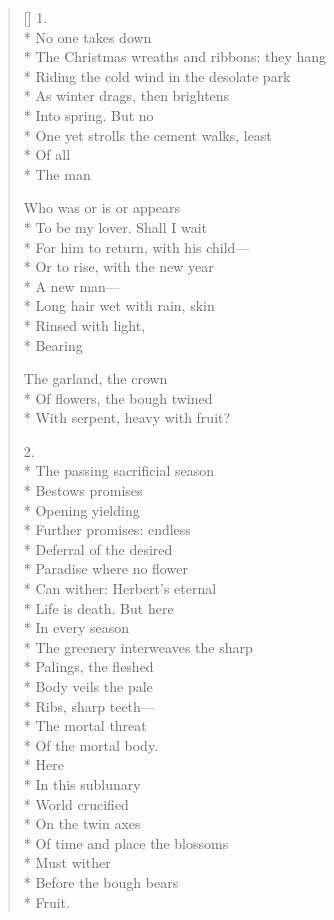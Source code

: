 \label{ch:in_time}
\settowidth{\versewidth}{The Christmas wreathes and ribbons: they flutter}
\begin{verse}[\versewidth]
1.\\*
No one takes down \\*
The Christmas wreaths and ribbons: they hang\\*
Riding the cold wind in the desolate park\\*
As winter drags, then brightens\\*
Into spring.   But no\\*
One yet strolls the cement walks, least\\*
Of all\\*
The man

Who was or is or appears\\*
To be my lover. Shall I wait\\*
For him to return, with his child---\\*
Or to rise, with the new year\\*
 A new man---\\*
Long hair wet with rain, skin\\*
Rinsed with light,\\*
Bearing

The garland, the crown\\*
Of flowers, the bough twined\\*
With serpent, heavy with fruit?

2.\\*
The passing sacrificial season\\*
Bestows promises\\*
Opening yielding\\*
Further promises: endless\\*
Deferral of the desired\\*
Paradise where no flower\\*
Can wither: Herbert's eternal\\*
Life is death.  But here\\*
In every season\\*
The greenery interweaves the sharp \\*
Palings, the fleshed\\*
Body veils the pale\\*
Ribs, sharp teeth---\\*
The mortal threat \\*
Of the mortal body.\\*
 Here\\*
In this sublunary \\*
World crucified\\*
On the twin axes \\*
Of time and place the blossoms\\*
Must wither\\*
Before the bough bears\\*
Fruit.


\end{verse}
